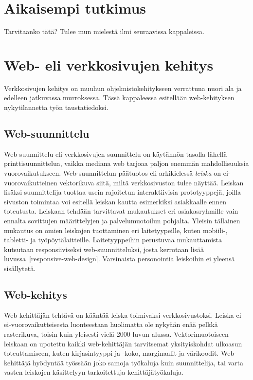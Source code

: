 \documentclass[finnish, 12pt, a4paper, elec, utf8, a-1b, online]{aaltothesis}
\begin{document}
\clearpage

\section{Aikaisempi tutkimus}

Tarvitaanko tätä? Tulee mun mielestä ilmi seuraavissa kappaleissa.

\clearpage

\section{Web- eli verkkosivujen kehitys}

Verkkosivujen kehitys on muuhun ohjelmistokehitykseen verrattuna nuori ala ja
edelleen jatkuvassa murroksessa. Tässä kappaleessa esitellään web-kehityksen
nykytilannetta työn taustatiedoksi.

\subsection{Web-suunnittelu}

Web-suunnittelu eli verkkosivujen suunnittelu on käytännön tasolla lähellä
printtisuunnittelua, vaikka mediana web tarjoaa paljon enemmän mahdollisuuksia
vuorovaikutukseen. Web-suunnittelun päätuotos eli arkikielessä \textit{leiska}
on ei-vuorovaikutteinen vektorikuva siitä, miltä verkkosivuston tulee näyttää.
Leiskan lisäksi suunnittelija tuottaa usein rajoitetun interaktiivisia
prototyyppejä, joilla sivuston toimintaa voi esitellä leiskan kautta esimerkiksi
asiakkaalle ennen toteutusta. Leiskaan tehdään tarvittavat mukautukset eri
asiakasryhmille vain ennalta sovittujen määrittelyjen ja palvelumuotoilun
pohjalta. Yleisin tällainen mukautus on omien leiskojen tuottaminen eri
laitetyypeille, kuten mobiili-, tabletti- ja työpöytälaitteille. Laitetyyppeihin
perustuvaa mukauttamista kutsutaan responsiiviseksi web-suunnitteluksi, josta
kerrotaan lisää luvussa~\ref{responsive-web-design}. Varsinaista personointia
leiskoihin ei yleensä sisällytetä.

\subsection{Web-kehitys}

Web-kehittäjän tehtävä on kääntää leiska toimivaksi verkkosivustoksi. Leiska ei
ei-vuorovaikutteisesta luonteestaan huolimatta ole nykyään enää pelkkä
rasterikuva, toisin kuin yleisesti vielä 2000-luvun alussa. Vektorimuotoiseen
leiskaan on upotettu kaikki web-kehittäjän tarvitsemat yksityiskohdat ulkoasun
toteuttamiseen, kuten kirjasintyyppi ja -koko, marginaalit ja värikoodit.
Web-kehittäjä hyödyntää työssään joko samoja työkaluja kuin suunnittelija, tai
varta vasten leiskojen käsittelyyn tarkoitettuja kehittäjätyökaluja.
\end{document}
